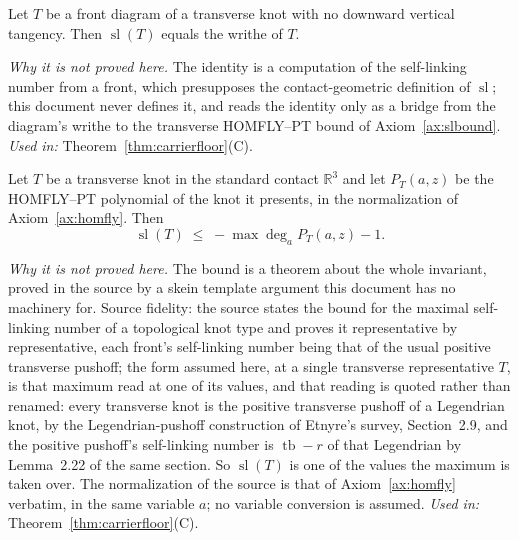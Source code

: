 \begin{axiom}\label{ax:etnyre}
Let $T$ be a front diagram of a transverse knot with no downward vertical
tangency. Then $\operatorname{sl}(T)$ equals the writhe of $T$.

\emph{Why it is not proved here.} The identity is a computation of the
self-linking number from a front, which presupposes the contact-geometric
definition of $\operatorname{sl}$; this document never defines it, and reads
the identity only as a bridge from the diagram's writhe to the transverse
HOMFLY--PT bound of Axiom~\ref{ax:slbound}.
\emph{Used in:} Theorem~\ref{thm:carrierfloor}(C).
\end{axiom}

\begin{axiom}\label{ax:slbound}
Let $T$ be a transverse knot in the standard contact $\mathbb R^3$ and let
$P_T(a,z)$ be the HOMFLY--PT polynomial of the knot it presents, in the
normalization of Axiom~\ref{ax:homfly}. Then
\[
   \operatorname{sl}(T)\;\leq\;-\max\deg_a P_T(a,z)-1 .
\]

\emph{Why it is not proved here.} The bound is a theorem about the whole
invariant, proved in the source by a skein template argument this document has
no machinery for. Source fidelity: the source states the bound for the maximal
self-linking number of a topological knot type and proves it representative by
representative, each front's self-linking number being that of the usual
positive transverse pushoff; the form assumed here, at a single transverse
representative $T$, is that maximum read at one of its values, and that
reading is quoted rather than renamed: every transverse knot is the positive
transverse pushoff of a Legendrian knot, by the Legendrian-pushoff
construction of Etnyre's survey, Section~2.9, and the positive pushoff's
self-linking number is $\operatorname{tb}-r$ of that Legendrian by Lemma~2.22
of the same section.  So $\operatorname{sl}(T)$ is one of the values the
maximum is taken over. The normalization of the source is that of Axiom~\ref{ax:homfly}
verbatim, in the same variable $a$; no variable conversion is assumed.
\emph{Used in:} Theorem~\ref{thm:carrierfloor}(C).
\end{axiom}

